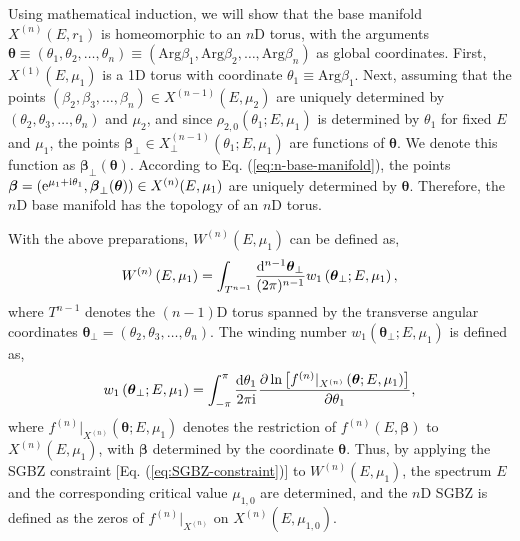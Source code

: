 \documentclass[pdflatex,sn-nature, iicol]{sn-jnl}%
\theoremstyle{thmstyleone}%
\theoremstyle{thmstyletwo}%
\theoremstyle{thmstylethree}%
\begin{document}
Using mathematical induction, we will show that the base manifold
$X^{(n)}(E,r_{1})$ is homeomorphic to an $n$D torus, with the arguments
$\boldsymbol{\theta}\equiv(\theta_{1},\theta_{2},\dots,\theta_{n})\equiv(\text{Arg}\beta_{1},\text{Arg}\beta_{2},\dots,\text{Arg}\beta_{n})$
as global coordinates. First, $X^{(1)}(E,\mu_{1})$ is a 1D torus
with coordinate $\theta_{1}\equiv\text{Arg}\beta_{1}$. Next, assuming
that the points $(\beta_{2},\beta_{3},\dots,\beta_{n})\in X^{(n-1)}(E,\mu_{2})$
are uniquely determined by $(\theta_{2},\theta_{3},\dots,\theta_{n})$
and $\mu_{2}$, and since $\rho_{2,0}(\theta_{1};E,\mu_{1})$  is determined
by $\theta_{1}$ for fixed $E$ and $\mu_{1}$, the points $\boldsymbol{\beta}_{\perp}\in X_{\perp}^{(n-1)}(\theta_{1};E,\mu_{1})$
are functions of $\boldsymbol{\theta}$. We denote this function as
$\boldsymbol{\beta}_{\perp}(\boldsymbol{\theta})$. According to Eq.
(\ref{eq:n-base-manifold}), the points $\boldsymbol{\beta}=(\mathrm{e}^{\mu_{1}+\mathrm{i}\theta_{1}},\boldsymbol{\beta}_{\perp}(\boldsymbol{\theta}))\in X^{(n)}(E,\mu_{1})$
are uniquely determined by $\boldsymbol{\theta}$. Therefore, the
$n$D base manifold has the topology of an $n$D torus.

With the above preparations, $W^{(n)}(E,\mu_{1})$ can be
defined as, 
\begin{equation}
W^{(n)}\left(E,\mu_{1}\right)=\int_{T^{n-1}}\frac{\mathrm{d}^{n-1}\boldsymbol{\theta}_{\perp}}{(2\pi)^{n-1}}w_{1}\left(\boldsymbol{\theta}_{\perp};E,\mu_{1}\right),
\end{equation}
where $T^{n-1}$ denotes the $(n-1)$D torus spanned by the transverse
angular coordinates $\boldsymbol{\theta}_{\perp}=(\theta_{2},\theta_{3},\dots,\theta_{n})$.
The winding number $w_{1}(\boldsymbol{\theta}_{\perp};E,\mu_{1})$
is defined as, 
\begin{equation}
w_{1}\left(\boldsymbol{\theta}_{\perp};E,\mu_{1}\right)=\int_{-\pi}^{\pi}\frac{\mathrm{d}\theta_{1}}{2\pi\mathrm{i}}\frac{\partial\ln\left[f^{(n)}|_{X^{(n)}}\left(\boldsymbol{\theta};E,\mu_{1}\right)\right]}{\partial\theta_{1}},\label{eq:w-loop-nD}
\end{equation}
where $f^{(n)}|_{X^{(n)}}(\boldsymbol{\theta};E,\mu_{1})$ denotes
the restriction of $f^{(n)}(E,\boldsymbol{\beta})$ to $X^{(n)}(E,\mu_{1})$,
with $\boldsymbol{\beta}$ determined by the coordinate $\boldsymbol{\theta}$.
Thus, by applying the SGBZ constraint {[}Eq. (\ref{eq:SGBZ-constraint}){]}
to $W^{(n)}(E,\mu_{1})$, the spectrum $E$ and the corresponding
critical value $\mu_{1,0}$ are determined, and the $n$D SGBZ is
defined as the zeros of $f^{(n)}|_{X^{(n)}}$ on $X^{(n)}(E,\mu_{1,0})$.
\end{document}
